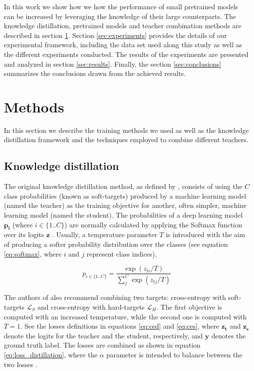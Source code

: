 \documentclass{elsarticle}
\begin{document}
	In this work we show how we how the performance of small pretrained models can be increased by leveraging the knowledge of their large counterparts. The knowledge distillation, pretrained models and teacher combination methods are described in section  \ref{sec:methods}. Section \ref{sec:experiments} provides the details of our experimental framework, including the data set used along this study as well as the different experiments conducted. The results of the experiments are presented and analyzed in section \ref{sec:results}. Finally, the section \ref{sec:conclusions} summarizes the conclusions drawn from the achieved results.
	
	\section{Methods} \label{sec:methods}
	In this section we describe the training methods we used as well as the knowledge distillation framework and the techniques employed to combine different teachers.
	
	\subsection{Knowledge distillation} \label{sec:kd}
	The original knowledge distillation method, as defined by \cite{hinton2015}, consists of using the $C$ class probabilities (known as soft-targets) produced by a machine learning model (named the teacher) as the training objective for another, often simpler, machine learning model (named the student). The probabilities of a deep learning model $\mathbf{p_i}$ (where $i \in \{1 .. C\}$) are normally calculated by applying the Softmax function over its logits $\mathbf{z}$ \cite{goodfellow2016}. Usually, a temperature parameter $T$ is introduced with the aim of producing a softer probability distribution over the classes (see equation \ref{eq:softmax}, where $i$ and $j$ represent class indices).
	
	\begin{equation}
	p_{i \in \{1 .. C\}} = \frac{\exp(z_{ti}/T)}{\sum_j^C \exp(z_{tj}/T)}
	\label{eq:softmax}
	\end{equation}
	
	The authors of \cite{hinton2015} also recommend combining two targets: cross-entropy with soft-targets $\mathcal{L}_S$ and cross-entropy with hard-targets  $\mathcal{L}_H$. The first objective is computed with an increased temperature, while the second one is computed with $T=1$. See the losses definitions in equations \ref{eq:ced} and \ref{eq:ces}, where $\mathbf{z_t}$ and $\mathbf{z_s}$ denote the logits for the teacher and the student, respectively, and $\mathbf{y}$ denotes the ground truth label. The losses are combined as shown in equation \ref{eq:loss_distillation}, where the $\alpha$ parameter is intended to balance between the two losses \cite{gou2020}.
	
\end{document}
